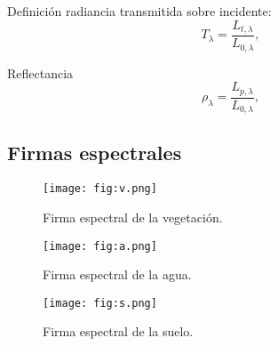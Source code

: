 \begin{frame}{}
    \begin{block}{Definición}
       radiancia transmitida sobre incidente:
        \begin{equation}
         T_\lambda = \frac{L_{t,\lambda}}{L_{0,\lambda}} ,
        \end{equation}
         \end{block}
\end{frame}








\begin{frame}{}
    \begin{block}{Reflectancia}
               \begin{equation}
         \rho_\lambda = \frac{L_{p,\lambda}}{L_{0,\lambda}} ,
        \end{equation}
         \end{block}
\end{frame}



\subsection{Firmas espectrales}

\begin{frame}{}
  \begin{figure}
    \centering
    \texttt{[image: fig:v.png]}
    \caption{Firma espectral de la vegetación.}
    \label{}
  \end{figure}
\end{frame}

\begin{frame}{}
  \begin{figure}
    \centering
    \texttt{[image: fig:a.png]}
    \caption{Firma espectral de la agua.}
    \label{}
  \end{figure}
\end{frame}

\begin{frame}{}
  \begin{figure}
    \centering
    \texttt{[image: fig:s.png]}
    \caption{Firma espectral de la suelo.}
    \label{}
  \end{figure}
\end{frame}

